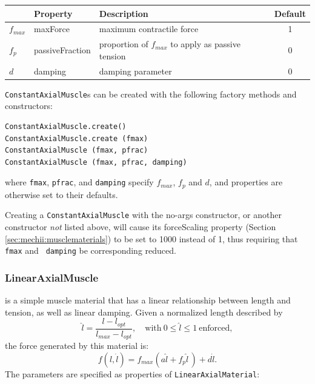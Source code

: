 \begin{center}
\begin{tabular}{|l|l|l|c|} \hline
 & Property & Description & Default \\
\hline
$f_{max}$ & {\sf maxForce} & maximum contractile force & 1 \\
$f_{p}$ & {\sf passiveFraction} & 
proportion of $f_{max}$ to apply as passive tension & 0 \\
$d$ & {\sf damping} & damping parameter & 0 \\
\hline
\end{tabular}
\end{center}

{\tt ConstantAxialMuscle}s can be created with the following factory
methods and constructors:
\begin{lstlisting}[]
ConstantAxialMuscle.create()
ConstantAxialMuscle.create (fmax)
ConstantAxialMuscle (fmax, pfrac)
ConstantAxialMuscle (fmax, pfrac, damping)
\end{lstlisting}
%
where {\tt fmax}, {\tt pfrac}, and {\tt damping} specify $f_{max}$, $f_p$
and $d$, and properties are otherwise set to their defaults.

\begin{sideblock}
Creating a {\tt ConstantAxialMuscle} with the no-args constructor, or
another constructor {\it not} listed above, will cause its {\sf
forceScaling} property (Section \ref{sec:mechii:musclematerials}) to
be set to 1000 instead of 1, thus requiring that {\tt fmax} and {\tt
damping} be corresponding reduced.
\end{sideblock}

\subsubsection{LinearAxialMuscle}

is a simple muscle material that has a linear relationship between
length and tension, as well as linear damping. Given a normalized
length described by
%
\begin{equation}
\hat l= \frac{l - l_{opt}}{l_{max} - l_{opt}}, 
\quad \mathrm{with}~ 0 \le \hat l \le 1~\mathrm{enforced},
\end{equation}
%
the force generated by this material is:
%
\begin{equation}
f(l, \dot l) = f_{max} \left( a \hat l +  f_{p} \hat l \, \right) + d \dot l.
\label{LinearAxialMaterial:eqn}
\end{equation}
%
The parameters are specified as properties of {\tt LinearAxialMaterial}:

